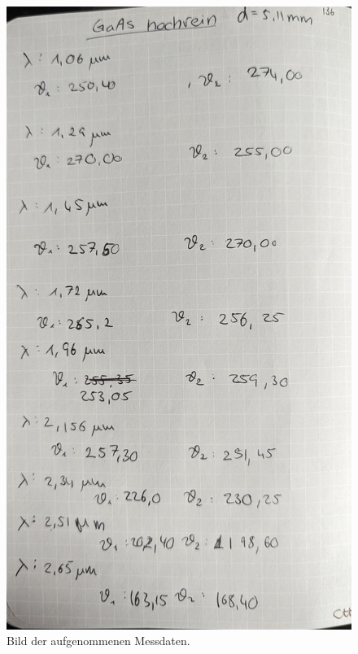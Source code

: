\begin{figure}[H]
              \centering
              \includegraphics[height=\textheight]{content/v46_pictures/messdaten_2.jpg}
              \caption{Bild der aufgenommenen Messdaten.}
              \label{fig:messdatenb}
\end{figure}
